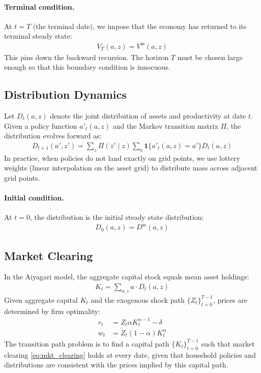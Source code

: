 \documentclass[12pt]{article}
\begin{document}
\paragraph{Terminal condition.} At $t = T$ (the terminal date), we impose that the economy has returned to its terminal steady state:
\begin{align}
    V_T(a, z) = V^{\text{ss}}(a, z) \label{eq:terminal}
\end{align}
This pins down the backward recursion. The horizon $T$ must be chosen large enough so that this boundary condition is innocuous.

\subsection{Distribution Dynamics}

Let $D_t(a, z)$ denote the joint distribution of assets and productivity at date $t$. Given a policy function $a'_t(a, z)$ and the Markov transition matrix $\Pi$, the distribution evolves forward as:
\begin{align}
    D_{t+1}(a', z') = \sum_{z} \Pi(z' \mid z) \sum_{a} \mathbf{1}\{a'_t(a, z) = a'\} D_t(a, z) \label{eq:forward_dist}
\end{align}
In practice, when policies do not land exactly on grid points, we use lottery weights (linear interpolation on the asset grid) to distribute mass across adjacent grid points.

\paragraph{Initial condition.} At $t = 0$, the distribution is the initial steady state distribution:
\begin{align}
    D_0(a, z) = D^{\text{ss}}(a, z) \label{eq:initial_dist}
\end{align}

\subsection{Market Clearing}

In the Aiyagari model, the aggregate capital stock equals mean asset holdings:
\begin{align}
    K_t = \sum_{a, z} a \cdot D_t(a, z) \label{eq:mkt_clearing}
\end{align}
Given aggregate capital $K_t$ and the exogenous shock path $\{Z_t\}_{t=0}^{T-1}$, prices are determined by firm optimality:
\begin{align}
    r_t &= Z_t \alpha K_t^{\alpha - 1} - \delta \label{eq:r_from_K} \\
    w_t &= Z_t (1 - \alpha) K_t^{\alpha} \label{eq:w_from_K}
\end{align}
The transition path problem is to find a capital path $\{K_t\}_{t=0}^{T-1}$ such that market clearing \eqref{eq:mkt_clearing} holds at every date, given that household policies and distributions are consistent with the prices implied by this capital path.
\end{document}
